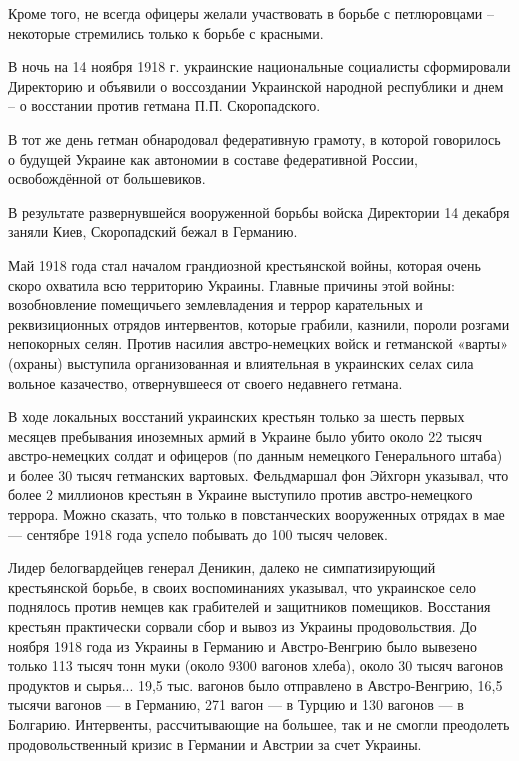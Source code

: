 \begin{itemize}
Кроме того, не всегда офицеры желали участвовать в борьбе с петлюровцами –
некоторые стремились только к борьбе с красными.

В ночь на 14 ноября 1918 г. украинские национальные социалисты сформировали
Директорию и объявили о воссоздании Украинской народной республики и днем – о
восстании против гетмана П.П. Скоропадского.

В тот же день гетман обнародовал федеративную грамоту, в которой говорилось о
будущей Украине как автономии в составе федеративной России, освобождённой от
большевиков.

В результате развернувшейся вооруженной борьбы войска Директории 14 декабря
заняли Киев, Скоропадский бежал в Германию.



Май 1918 года стал началом грандиозной крестьянской войны, которая очень скоро
охватила всю территорию Украины. Главные причины этой войны: возобновление
помещичьего землевладения и террор карательных и реквизиционных отрядов
интервентов, которые грабили, казнили, пороли розгами непокорных селян. Против
насилия австро-немецких войск и гетманской «варты» (охраны) выступила
организованная и влиятельная в украинских селах сила вольное казачество,
отвернувшееся от своего недавнего гетмана.

В ходе локальных восстаний украинских крестьян только за шесть первых месяцев
пребывания иноземных армий в Украине было убито около 22 тысяч австро-немецких
солдат и офицеров (по данным немецкого Генерального штаба) и более 30 тысяч
гетманских вартовых. Фельдмаршал фон Эйхгорн указывал, что более 2 миллионов
крестьян в Украине выступило против австро-немецкого террора. Можно сказать,
что только в повстанческих вооруженных отрядах в мае — сентябре 1918 года
успело побывать до 100 тысяч человек.

Лидер белогвардейцев генерал Деникин, далеко не симпатизирующий крестьянской
борьбе, в своих воспоминаниях указывал, что украинское село поднялось против
немцев как грабителей и защитников помещиков. Восстания крестьян практически
сорвали сбор и вывоз из Украины продовольствия. До ноября 1918 года из Украины
в Германию и Австро-Венгрию было вывезено только 113 тысяч тонн муки (около
9300 вагонов хлеба), около 30 тысяч вагонов продуктов и сырья... 19,5 тыс.
вагонов было отправлено в Австро-Венгрию, 16,5 тысячи вагонов — в Германию, 271
вагон — в Турцию и 130 вагонов — в Болгарию. Интервенты, рассчитывающие на
большее, так и не смогли преодолеть продовольственный кризис в Германии и
Австрии за счет Украины.


\end{itemize}
